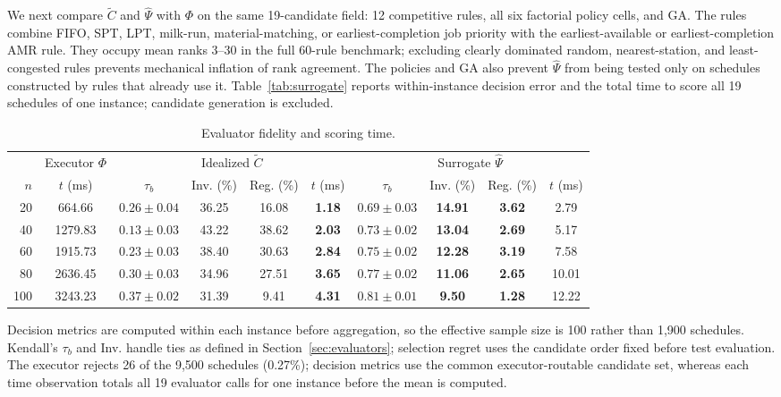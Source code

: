 We next compare $\widetilde C$ and $\hat\Psi$ with $\Phi$ on the same
19-candidate field: 12 competitive rules, all six factorial policy cells, and
GA. The rules combine FIFO, SPT, LPT, milk-run, material-matching, or
earliest-completion job priority with the earliest-available or
earliest-completion AMR rule. They occupy mean ranks 3--30 in the full 60-rule
benchmark; excluding clearly dominated random, nearest-station, and
least-congested rules prevents mechanical inflation of rank agreement. The
policies and GA also prevent $\hat\Psi$ from being tested only on schedules
constructed by rules that already use it. Table~\ref{tab:surrogate} reports
within-instance decision error and the total time to score all 19 schedules of
one instance; candidate generation is excluded.

\begin{table}[!t]
\caption{Evaluator fidelity and scoring time.}
\label{tab:surrogate}
\label{tab:evaluator-time}
\centering
\scriptsize
\setlength{\tabcolsep}{3.0pt}
\begin{tabular}{@{}r|c|cccc|cccc@{}}
\toprule
& Executor $\Phi$ & \multicolumn{4}{c}{Idealized $\widetilde C$}
& \multicolumn{4}{c}{Surrogate $\hat\Psi$} \\
\cmidrule(lr){2-2}\cmidrule(lr){3-6}\cmidrule(lr){7-10}
$n$ & $t$ (ms) & $\tau_b$ & Inv. (\%) & Reg. (\%) & $t$ (ms)
    & $\tau_b$ & Inv. (\%) & Reg. (\%) & $t$ (ms) \\
\midrule
20  & 664.66 & $0.26\pm0.04$ & 36.25 & 16.08
    & \textbf{1.18} & $\mathbf{0.69\pm0.03}$
    & \textbf{14.91} & \textbf{3.62} & 2.79 \\
40  & 1279.83 & $0.13\pm0.03$ & 43.22 & 38.62
    & \textbf{2.03} & $\mathbf{0.73\pm0.02}$
    & \textbf{13.04} & \textbf{2.69} & 5.17 \\
60  & 1915.73 & $0.23\pm0.03$ & 38.40 & 30.63
    & \textbf{2.84} & $\mathbf{0.75\pm0.02}$
    & \textbf{12.28} & \textbf{3.19} & 7.58 \\
80  & 2636.45 & $0.30\pm0.03$ & 34.96 & 27.51
    & \textbf{3.65} & $\mathbf{0.77\pm0.02}$
    & \textbf{11.06} & \textbf{2.65} & 10.01 \\
100 & 3243.23 & $0.37\pm0.02$ & 31.39 & 9.41
    & \textbf{4.31} & $\mathbf{0.81\pm0.01}$
    & \textbf{9.50} & \textbf{1.28} & 12.22 \\
\bottomrule
\end{tabular}
\end{table}

Decision metrics are computed within each instance before aggregation, so the
effective sample size is 100 rather than 1,900 schedules. Kendall's $\tau_b$
and Inv. handle ties as defined in Section~\ref{sec:evaluators}; selection
regret uses the candidate order fixed before test evaluation. The executor
rejects 26 of the 9,500 schedules (0.27\%); decision metrics use the common
executor-routable candidate set, whereas each time observation totals all 19
evaluator calls for one instance before the mean is computed.

